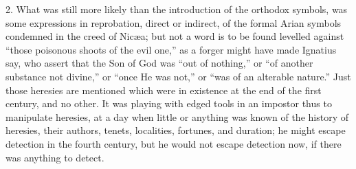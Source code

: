2. What was still more likely
than the introduction of the orthodox symbols, was some expressions in
reprobation, direct or indirect, of the formal Arian symbols condemned in the creed of Nicæa; but not a word is to be found
levelled against ``those poisonous shoots of the evil one,'' as a forger
might have made Ignatius say, who assert that the Son of God was ``out
of nothing,'' or ``of another substance not divine,'' or ``once He was
not,'' or ``was of an alterable nature.'' Just those heresies are
mentioned which were in existence at the end of the first century, and
no other. It was playing with edged tools in an impostor thus to
manipulate heresies, at a day when little or anything was known of the
history of heresies, their authors, tenets, localities, fortunes, and
duration; he might escape detection in the fourth century, but he
would not escape detection now, if there was anything to detect.

